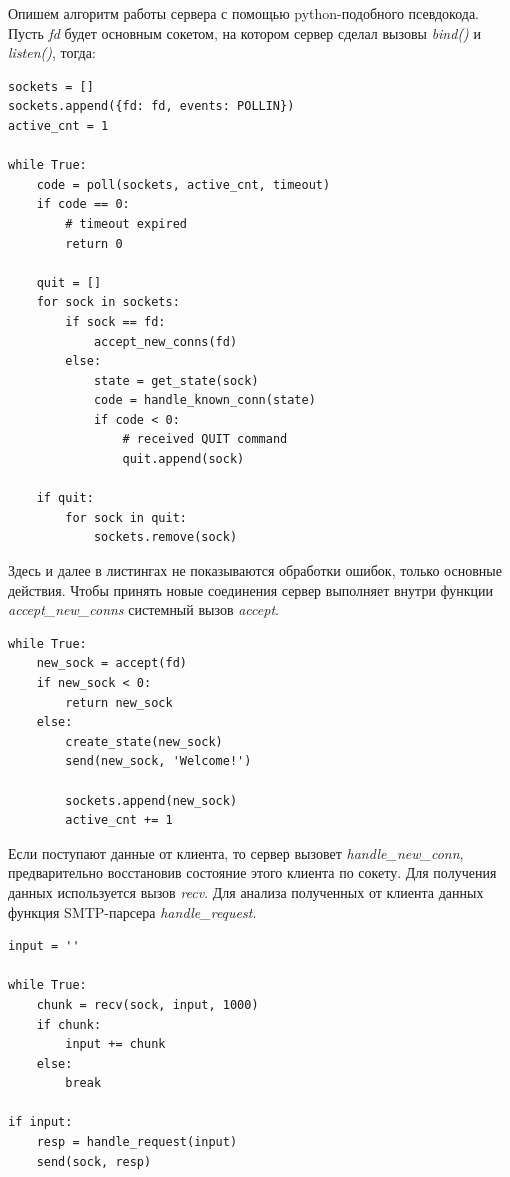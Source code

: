 \documentclass[a4paper,12pt]{report}
\begin{document}
Опишем алгоритм работы сервера с помощью python-подобного псевдокода. Пусть \textit{fd} будет основным сокетом, на котором сервер сделал вызовы \textit{bind()} и \textit{listen()}, тогда:

\begin{verbatim}
sockets = []
sockets.append({fd: fd, events: POLLIN})
active_cnt = 1

while True:
    code = poll(sockets, active_cnt, timeout)
    if code == 0:
        # timeout expired
        return 0

    quit = []
    for sock in sockets:
        if sock == fd:
            accept_new_conns(fd)
        else:
            state = get_state(sock)
            code = handle_known_conn(state) 
            if code < 0:
                # received QUIT command
                quit.append(sock)

    if quit:
        for sock in quit:
            sockets.remove(sock)
\end{verbatim}

Здесь и далее в листингах не показываются обработки ошибок, только основные действия. Чтобы принять новые соединения сервер выполняет внутри функции \textit{accept_new_conns} системный вызов \textit{accept}.

\begin{verbatim}
while True:
    new_sock = accept(fd)
    if new_sock < 0:
        return new_sock
    else:
        create_state(new_sock)
        send(new_sock, 'Welcome!')

        sockets.append(new_sock)
        active_cnt += 1
\end{verbatim}

Если поступают данные от клиента, то сервер вызовет \textit{handle_new_conn}, предварительно восстановив состояние этого клиента по сокету. Для получения данных используется вызов \textit{recv}. Для анализа полученных от клиента данных функция SMTP-парсера \textit{handle_request}.

\begin{verbatim}
input = ''

while True:
    chunk = recv(sock, input, 1000)
    if chunk:
        input += chunk
    else:
        break

if input:
    resp = handle_request(input)
    send(sock, resp)

\end{verbatim}

\end{document}
